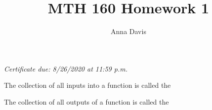 \documentclass{ximera}
\author{Anna Davis} \title{MTH 160 Homework 1}
\begin{document}
\begin{abstract}

\end{abstract}
\maketitle
 \textit{Certificate due: 8/26/2020 at 11:59 p.m.}
\begin{problem}\label{prob:160hom1prob1}
The collection of all inputs into a function is called the
\begin{multipleChoice}  
\end{multipleChoice}  
\end{problem}

\begin{problem}\label{prob:160hom1prob2}
The collection of all outputs of a function is called the
\begin{multipleChoice}  
\end{multipleChoice}  
\end{problem}
\end{document}
